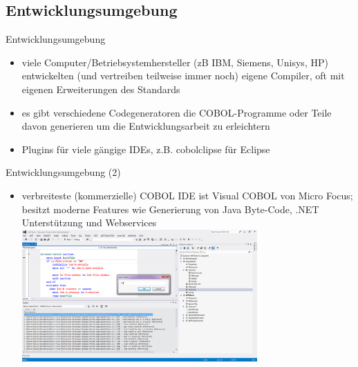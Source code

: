 \documentclass{beamer}
\begin{document}
\subsection{Entwicklungsumgebung}
\begin{frame}{Entwicklungsumgebung}
	\begin{itemize}[<+->]
		\item
			viele Computer/Betriebsystemhersteller (zB IBM, Siemens, Unisys, HP) entwickelten (und vertreiben teilweise immer noch) eigene Compiler, oft mit eigenen Erweiterungen des Standards
		\item
			es gibt verschiedene Codegeneratoren die COBOL-Programme oder Teile davon generieren um die Entwicklungsarbeit zu erleichtern
		\item
			Plugins für viele gängige IDEs, z.B. cobolclipse für Eclipse
	\end{itemize}
\end{frame}

\begin{frame}{Entwicklungsumgebung (2)}
	\begin{itemize}
		\item
			verbreiteste (kommerzielle) COBOL IDE ist Visual COBOL von Micro Focus; besitzt moderne Features wie Generierung von Java Byte-Code, .NET Unterstützung und Webservices
		\includegraphics[width=9cm]{VisualCOBOL2}
	\end{itemize}
\end{frame}
\end{document}
